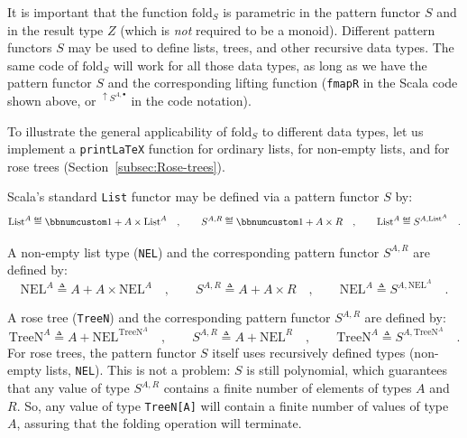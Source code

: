 It is important that the function $\text{fold}_{S}$ is parametric
in the pattern functor $S$ and in the result type $Z$ (which is
\emph{not} required to be a monoid). Different pattern functors $S$
may be used to define lists, trees, and other recursive data types.
The same code of $\text{fold}_{S}$ will work for all those data types,
as long as we have the pattern functor $S$ and the corresponding
lifting function (\lstinline!fmapR! in the Scala code shown above,
or $^{\uparrow S^{A,\bullet}}$ in the code notation).

To illustrate the general applicability of $\text{fold}_{S}$ to different
data types, let us implement a \lstinline!printLaTeX! function for
ordinary lists, for non-empty lists, and for rose trees (Section~\ref{subsec:Rose-trees}).

Scala\textsf{'}s standard \lstinline!List! functor may be defined via a pattern
functor $S$ by:
\[
\text{List}^{A}\triangleq\bbnum 1+A\times\text{List}^{A}\quad,\quad\quad S^{A,R}\triangleq\bbnum 1+A\times R\quad,\quad\quad\text{List}^{A}\triangleq S^{A,\text{List}^{A}}\quad.
\]

A non-empty list type (\lstinline!NEL!) and the corresponding pattern
functor $S^{A,R}$ are defined by:
\[
\text{NEL}^{A}\triangleq A+A\times\text{NEL}^{A}\quad,\quad\quad S^{A,R}\triangleq A+A\times R\quad,\quad\quad\text{NEL}^{A}\triangleq S^{A,\text{NEL}^{A}}\quad.
\]

A rose tree (\lstinline!TreeN!) and the corresponding pattern functor
$S^{A,R}$ are defined by:
\[
\text{TreeN}^{A}\triangleq A+\text{NEL}^{\text{TreeN}^{A}}\quad,\quad\quad S^{A,R}\triangleq A+\text{NEL}^{R}\quad,\quad\quad\text{TreeN}^{A}\triangleq S^{A,\text{TreeN}^{A}}\quad.
\]
For rose trees, the pattern functor $S$ itself uses recursively defined
types (non-empty lists, \lstinline!NEL!). This is not a problem:
$S$ is still polynomial, which guarantees that any value of type
$S^{A,R}$ contains a finite number of elements of types $A$ and
$R$. So, any value of type \lstinline!TreeN[A]! will contain a finite
number of values of type $A$, assuring that the folding operation
will terminate.

